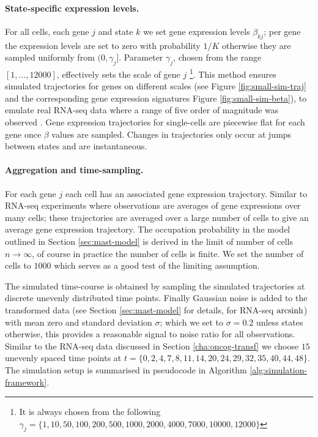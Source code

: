 \paragraph{State-specific expression levels.}
\label{sec:state-spec-expr}
For all cells, each gene $j$ and state $k$ we set gene expression levels $\beta_{kj}$; per gene the expression levels are set to zero with probability $1/K$ otherwise they are sampled uniformly from $(0, \gamma_j]$. Parameter $\gamma_j$, chosen from the range $[1, \ldots, 12000]$, effectively sets the scale of gene $j$ \footnote{It is always chosen from the following $\gamma_j = \lbrace 1, 10, 50, 100, 200, 500, 1000, 2000, 4000, 7000, 10000, 12000 \rbrace$}. This method ensures simulated trajectories for genes on different scales (see Figure \ref{fig:small-sim-traj} and the corresponding gene expression signatures Figure \ref{fig:small-sim-beta}), to emulate real RNA-seq data  where a range of five order of magnitude was observed \citep{Wang:2009ur,Mortazavi:2008jj}. Gene expression trajectories for single-cells are piecewise flat for each gene once $\beta$ values are sampled. Changes in trajectories only occur at jumps between states and are instantaneous.

\paragraph{Aggregation and time-sampling.}
\label{sec:aggr-time-sampl}
For each gene $j$ each cell has an associated gene expression trajectory. Similar to RNA-seq experiments where observations are averages of gene expressions over many cells; these trajectories are averaged over a large number of cells to give an average gene expression trajectory. The occupation probability in the model outlined in Section \ref{sec:mast-model} is derived in the limit of number of cells $n \rightarrow \infty$, of course in practice the number of cells is finite. We set the number of cells to $1000$ which serves as a good test of the limiting assumption.

The simulated time-course is obtained by sampling the simulated trajectories at discrete unevenly distributed time points. Finally Gaussian noise is added to the transformed data (see Section \ref{sec:mast-model} for details, for RNA-seq $\operatorname{arcsinh}$) with mean zero and standard deviation $\sigma$; which we set to $\sigma=0.2$ unless states otherwise, this provides a reasonable signal to noise ratio for all observations. Similar to the RNA-seq data discussed in Section \ref{cha:oncog-transf} we choose $15$ unevenly spaced  time points at $t=\lbrace 0,  2,  4,  7,  8, 11, 14, 20, 24, 29, 32, 35, 40, 44, 48\rbrace$. The simulation setup is summarised in pseudocode in Algorithm \ref{alg:simulation-framework}. 


